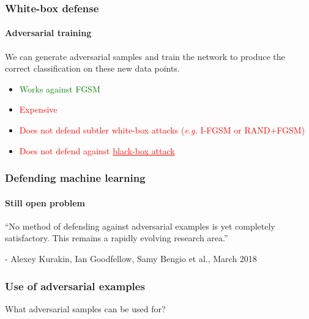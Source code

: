 \documentclass[9pt]{beamer}
\begin{document}
\begin{frame}
  \frametitle{White-box defense}

  \framesubtitle{Adversarial training}

  We can generate adversarial samples and train the network to produce
  the correct classification on these new data points.

  \medskip

  \begin{itemize}
  \item \textcolor{green}{Works against FGSM}
  \item \textcolor{red}{Expensive}
  \item \textcolor{red}{Does not defend subtler white-box
    attacks (\textit{e.g.} I-FGSM or RAND+FGSM)}
  \item \textcolor{red}{Does not defend against \underline{black-box
      attack}}
  \end{itemize}
\end{frame}

\begin{frame}

  \frametitle{Defending machine learning}

  \framesubtitle{Still open problem}

  ``No method of defending against adversarial examples is yet
  completely satisfactory. This remains a rapidly evolving research
  area.''

  \bigskip

  - Alexey Kurakin, Ian Goodfellow, Samy Bengio et al., March 2018
\end{frame}

\begin{frame}
  \frametitle{Use of adversarial examples}

  What adversarial samples can be used for?
\end{frame}
\end{document}
